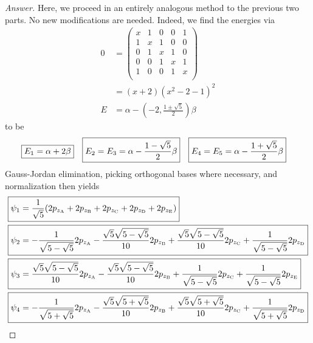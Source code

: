 \documentclass[../psets.tex]{subfiles}
\begin{document}
\begin{enumerate}
\begin{enumerate}
        \begin{proof}[Answer]
            Here, we proceed in an entirely analogous method to the previous two parts. No new modifications are needed. Indeed, we find the energies via
            \begin{align*}
                0 &=
                \begin{pmatrix}
                    x & 1 & 0 & 0 & 1\\
                    1 & x & 1 & 0 & 0\\
                    0 & 1 & x & 1 & 0\\
                    0 & 0 & 1 & x & 1\\
                    1 & 0 & 0 & 1 & x\\
                \end{pmatrix}\\
                &= (x+2)(x^2-2-1)^2\\
                E &= \alpha-\left( -2,\frac{1\pm\sqrt{5}}{2} \right)\beta
            \end{align*}
            to be
            \begin{align*}
                \Aboxed{E_1 &= \alpha+2\beta}&
                \Aboxed{E_2 = E_3 &= \alpha-\frac{1-\sqrt{5}}{2}\beta}&
                \Aboxed{E_4 = E_5 &= \alpha-\frac{1+\sqrt{5}}{2}\beta}
            \end{align*}
            Gauss-Jordan elimination, picking orthogonal bases where necessary, and normalization then yields
            \begin{align*}
                \Aboxed{\psi_1 &= \frac{1}{\sqrt{5}}(2p_{z_\text{A}}+2p_{z_\text{B}}+2p_{z_\text{C}}+2p_{z_\text{D}}+2p_{z_\text{E}})}\\
                \Aboxed{\psi_2 &= -\frac{1}{\sqrt{5-\sqrt{5}}}2p_{z_\text{A}}-\frac{\sqrt{5}\sqrt{5-\sqrt{5}}}{10}2p_{z_\text{B}}+\frac{\sqrt{5}\sqrt{5-\sqrt{5}}}{10}2p_{z_\text{C}}+\frac{1}{\sqrt{5-\sqrt{5}}}2p_{z_\text{D}}}\\
                \Aboxed{\psi_3 &= \frac{\sqrt{5}\sqrt{5-\sqrt{5}}}{10}2p_{z_\text{A}}-\frac{\sqrt{5}\sqrt{5-\sqrt{5}}}{10}2p_{z_\text{B}}+\frac{1}{\sqrt{5-\sqrt{5}}}2p_{z_\text{C}}+\frac{1}{\sqrt{5-\sqrt{5}}}2p_{z_\text{E}}}\\
                \Aboxed{\psi_4 &= -\frac{1}{\sqrt{5+\sqrt{5}}}2p_{z_\text{A}}-\frac{\sqrt{5}\sqrt{5+\sqrt{5}}}{10}2p_{z_\text{B}}+\frac{\sqrt{5}\sqrt{5+\sqrt{5}}}{10}2p_{z_\text{C}}+\frac{1}{\sqrt{5+\sqrt{5}}}2p_{z_\text{D}}}\\

\end{align*}
\end{proof}
\end{enumerate}
\end{enumerate}
\end{document}

